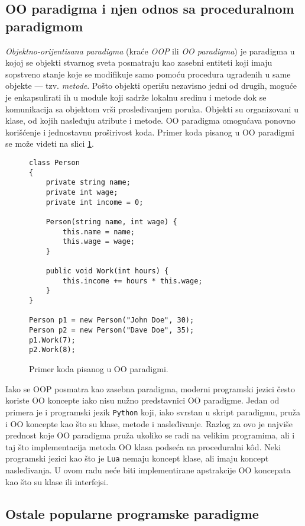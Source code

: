 \subsection{OO paradigma i njen odnos sa proceduralnom paradigmom}
\label{subsec:ParadigmOOP}

\emph{Objektno-orijentisana paradigma} (kraće \emph{OOP} ili \emph{OO paradigma}) je paradigma u kojoj se objekti stvarnog sveta posmatraju kao zasebni entiteti koji imaju sopstveno stanje koje se modifikuje samo pomoću procedura ugrađenih u same objekte --- tzv. \emph{metode}. Pošto objekti operišu nezavisno jedni od drugih, moguće je enkapsulirati ih u module koji sadrže lokalnu sredinu i metode dok se komunikacija sa objektom vrši prosleđivanjem poruka. Objekti su organizovani u klase, od kojih nasleđuju atribute i metode. OO paradigma omogućava ponovno korišćenje i jednostavnu proširivost koda. Primer koda pisanog u OO paradigmi se može videti na slici \ref{fig:ParadigmOO}.

\begin{figure}[h!]
\begin{lstlisting}
class Person
{
    private string name;
    private int wage;
    private int income = 0;

    Person(string name, int wage) {
        this.name = name;
        this.wage = wage;
    }

    public void Work(int hours) {
        this.income += hours * this.wage;
    }
}

Person p1 = new Person("John Doe", 30);
Person p2 = new Person("Dave Doe", 35);
p1.Work(7);
p2.Work(8);
\end{lstlisting}
\caption{Primer koda pisanog u OO paradigmi.}
\label{fig:ParadigmOO}
\end{figure}

Iako se OOP posmatra kao zasebna paradigma, moderni programski jezici često koriste OO koncepte iako nisu nužno predstavnici OO paradigme. Jedan od primera je i programski jezik \texttt{Python} koji, iako svrstan u skript paradigmu, pruža i OO koncepte kao što su klase, metode i nasleđivanje. Razlog za ovo je najviše prednost koje OO paradigma pruža ukoliko se radi na velikim programima, ali i taj što implementacija metoda OO klasa podseća na proceduralni k\^od. Neki programski jezici kao što je \texttt{Lua} nemaju koncept klase, ali imaju koncept nasleđivanja. U ovom radu neće biti implementirane apstrakcije OO koncepata kao što su klase ili interfejsi.

\subsection{Ostale popularne programske paradigme}
\label{subsec:ParadigmsOther}

